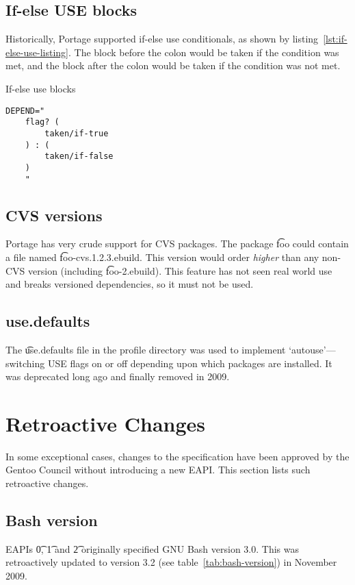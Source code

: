 \subsection{If-else USE blocks}
Historically, Portage supported if-else use conditionals, as shown by
listing~\ref{lst:if-else-use-listing}. The block before the colon would be taken if the condition
was met, and the block after the colon would be taken if the condition was not met.

\begin{listing}
\caption{If-else use blocks} \label{lst:if-else-use-listing}
\begin{verbatim}
DEPEND="
    flag? (
        taken/if-true
    ) : (
        taken/if-false
    )
    "
\end{verbatim}
\end{listing}

\subsection{CVS versions}
Portage has very crude support for CVS packages. The package \t{foo} could contain a file named
\t{foo-cvs.1.2.3.ebuild}. This version would order \emph{higher} than any non-CVS version (including
\t{foo-2.ebuild}). This feature has not seen real world use and breaks versioned dependencies, so
it must not be used.

\subsection{use.defaults}
The \t{use.defaults} file in the profile directory was used to implement `autouse'---switching USE
flags on or off depending upon which packages are installed. It was deprecated long ago and finally
removed in 2009.

\section{Retroactive Changes}

In some exceptional cases, changes to the specification have been approved by the Gentoo Council
without introducing a new EAPI\@. This section lists such retroactive changes.

\subsection{Bash version}
EAPIs \t{0}, \t{1} and \t{2} originally specified GNU Bash version 3.0. This was retroactively
updated to version 3.2 (see table~\ref{tab:bash-version}) in November 2009.

